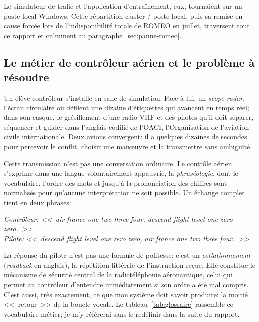 \documentclass[11pt,a4paper]{article}
\begin{document}
Le simulateur de trafic et l'application d'entraînement, eux, tournaient sur un poste local Windows. Cette répartition cluster / poste local, puis sa remise en cause forcée lors de l'indisponibilité totale de ROMEO en juillet, traversent tout ce rapport et culminent au paragraphe~\ref{sec:panne-romeo}.

\subsection{Le métier de contrôleur aérien et le problème à résoudre}

Un élève contrôleur s'installe en salle de simulation. Face à lui, un \emph{scope radar}, l'écran circulaire où défilent une dizaine d'étiquettes qui avancent en temps réel; dans son casque, le grésillement d'une radio VHF et des pilotes qu'il doit séparer, séquencer et guider dans l'anglais codifié de l'OACI, l'Organisation de l'aviation civile internationale. Deux avions convergent: il a quelques dizaines de secondes pour percevoir le conflit, choisir une man\oe uvre et la transmettre sans ambiguïté.

Cette transmission n'est pas une conversation ordinaire. Le contrôle aérien s'exprime dans une langue volontairement appauvrie, la \emph{phraséologie}, dont le vocabulaire, l'ordre des mots et jusqu'à la prononciation des chiffres sont normalisés pour qu'aucune interprétation ne soit possible. Un échange complet tient en deux phrases:

\begin{center}
\begin{minipage}{0.86\textwidth}\itshape\small
Contrôleur: <<~air france one two three four, descend flight level one zero zero.~>>\\
Pilote: <<~descend flight level one zero zero, air france one two three four.~>>
\end{minipage}
\end{center}

\noindent La réponse du pilote n'est pas une formule de politesse: c'est un \emph{collationnement} (\emph{readback} en anglais), la répétition littérale de l'instruction reçue. Elle constitue le mécanisme de sécurité central de la radiotéléphonie aéronautique, celui qui permet au contrôleur d'entendre immédiatement si son ordre a été mal compris. C'est aussi, très exactement, ce que mon système doit savoir produire: la moitié <<~retour~>> de la boucle vocale. Le tableau~\ref{tab:glossaire} rassemble ce vocabulaire métier; je m'y référerai sans le redéfinir dans la suite du rapport.
\end{document}
